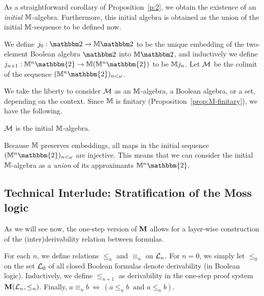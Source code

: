 \documentclass{book}
\begin{document}
As a straightforward corollary of Proposition~\ref{p:2}, we obtain the
existence of an \emph{initial} $\mathbb{M}$-algebra.  Furthermore, this
initial algebra is obtained as the union of the initial $\mathbb{M}$-sequence
to be defined now.

\begin{definition}
We define $j_0: \xxvibbtwo \to \xxviM \xxvibbtwo$ to be the unique
embedding of the two-element Boolean algebra 
$\xxvibbtwo$ into $\xxviM \xxvibbtwo$, and inductively we define
$j_{n+1}:\xxviM^n\mathbbm{2}\to \xxviM(\xxviM^n\mathbbm{2})$ to be $\mathbb{M} j_n$.  Let
$\mathcal{M}$ be the colimit of the sequence $(\xxviM^n\mathbbm{2})_{n<\omega}$.
\end{definition}

We take the liberty to consider $\mathcal{M}$ as an $\mathbb{M}$-algebra, a Boolean
algebra, or a set, depending on the context.  Since $\mathbb{M}$ is finitary
(Proposition~\ref{prop:M-finitary}), we have the following.

\begin{corollary}
\label{c:LTM}
$\mathcal{M}$ is the initial $\mathbb{M}$-algebra.
\end{corollary}

Because $\mathbb{M}$ preserves embeddings, all maps in the initial sequence
$(\xxviM^n\mathbbm{2})_{n<\omega}$ are injective. 
This means that
we can consider the initial $\mathbb{M}$-algebra as a \emph{union} of its
approximants $\xxviM^n\mathbbm{2}$.

\subsection{Technical Interlude: Stratification of the Moss logic}
\label{sec:stratification}

As we will see now, the one-step version of $\mathbf{M}$ allows for a
layer-wise
construction of the (inter)derivability relation between formulas.

\begin{definition}\label{def:equiv-n}
For each $n$, we define relations $\le_{n}$ and $\equiv_{n}$ on
$\mathcal{L}_{n}$.  For $n=0$, we simply let $\leq_{0}$ on the set $\mathcal{L}_0$
of all closed Boolean formulas denote derivability (in Boolean logic).
Inductively, we define $\le_{n+1}$ as derivability in the one-step
proof system $\mathbf{M}(\mathcal{L}_{n},{\le_{n}})$.  Finally, $a \equiv_n b
\ \Leftrightarrow \ (a\le_n b \ \textrm{ and } a \le_n b)$.
\end{definition}
\end{document}
